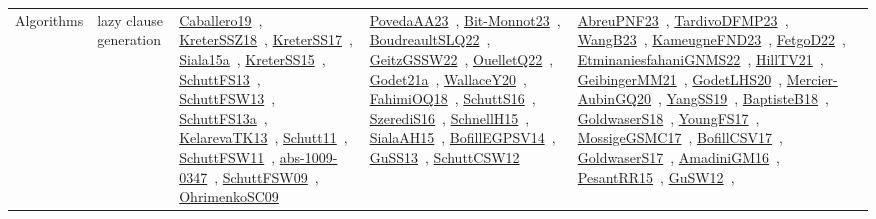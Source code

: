 {\begin{longtable}{lp{3cm}>{\raggedright\arraybackslash}p{6cm}>{\raggedright\arraybackslash}p{6cm}>{\raggedright\arraybackslash}p{8cm}}
Algorithms & lazy clause generation & \href{../works/Caballero19.pdf}{Caballero19}~\cite{Caballero19}, \href{../works/KreterSSZ18.pdf}{KreterSSZ18}~\cite{KreterSSZ18}, \href{../works/KreterSS17.pdf}{KreterSS17}~\cite{KreterSS17}, \href{../works/Siala15a.pdf}{Siala15a}~\cite{Siala15a}, \href{../works/KreterSS15.pdf}{KreterSS15}~\cite{KreterSS15}, \href{../works/SchuttFS13.pdf}{SchuttFS13}~\cite{SchuttFS13}, \href{../works/SchuttFSW13.pdf}{SchuttFSW13}~\cite{SchuttFSW13}, \href{../works/SchuttFS13a.pdf}{SchuttFS13a}~\cite{SchuttFS13a}, \href{../works/KelarevaTK13.pdf}{KelarevaTK13}~\cite{KelarevaTK13}, \href{../works/Schutt11.pdf}{Schutt11}~\cite{Schutt11}, \href{../works/SchuttFSW11.pdf}{SchuttFSW11}~\cite{SchuttFSW11}, \href{../works/abs-1009-0347.pdf}{abs-1009-0347}~\cite{abs-1009-0347}, \href{../works/SchuttFSW09.pdf}{SchuttFSW09}~\cite{SchuttFSW09}, \href{../works/OhrimenkoSC09.pdf}{OhrimenkoSC09}~\cite{OhrimenkoSC09} & \href{../works/PovedaAA23.pdf}{PovedaAA23}~\cite{PovedaAA23}, \href{../works/Bit-Monnot23.pdf}{Bit-Monnot23}~\cite{Bit-Monnot23}, \href{../works/BoudreaultSLQ22.pdf}{BoudreaultSLQ22}~\cite{BoudreaultSLQ22}, \href{../works/GeitzGSSW22.pdf}{GeitzGSSW22}~\cite{GeitzGSSW22}, \href{../works/OuelletQ22.pdf}{OuelletQ22}~\cite{OuelletQ22}, \href{../works/Godet21a.pdf}{Godet21a}~\cite{Godet21a}, \href{../works/WallaceY20.pdf}{WallaceY20}~\cite{WallaceY20}, \href{../works/FahimiOQ18.pdf}{FahimiOQ18}~\cite{FahimiOQ18}, \href{../works/SchuttS16.pdf}{SchuttS16}~\cite{SchuttS16}, \href{../works/SzerediS16.pdf}{SzerediS16}~\cite{SzerediS16}, \href{../works/SchnellH15.pdf}{SchnellH15}~\cite{SchnellH15}, \href{../works/SialaAH15.pdf}{SialaAH15}~\cite{SialaAH15}, \href{../works/BofillEGPSV14.pdf}{BofillEGPSV14}~\cite{BofillEGPSV14}, \href{../works/GuSS13.pdf}{GuSS13}~\cite{GuSS13}, \href{../works/SchuttCSW12.pdf}{SchuttCSW12}~\cite{SchuttCSW12} & \href{../works/AbreuPNF23.pdf}{AbreuPNF23}~\cite{AbreuPNF23}, \href{../works/TardivoDFMP23.pdf}{TardivoDFMP23}~\cite{TardivoDFMP23}, \href{../works/WangB23.pdf}{WangB23}~\cite{WangB23}, \href{../works/KameugneFND23.pdf}{KameugneFND23}~\cite{KameugneFND23}, \href{../works/FetgoD22.pdf}{FetgoD22}~\cite{FetgoD22}, \href{../works/EtminaniesfahaniGNMS22.pdf}{EtminaniesfahaniGNMS22}~\cite{EtminaniesfahaniGNMS22}, \href{../works/HillTV21.pdf}{HillTV21}~\cite{HillTV21}, \href{../works/GeibingerMM21.pdf}{GeibingerMM21}~\cite{GeibingerMM21}, \href{../works/GodetLHS20.pdf}{GodetLHS20}~\cite{GodetLHS20}, \href{../works/Mercier-AubinGQ20.pdf}{Mercier-AubinGQ20}~\cite{Mercier-AubinGQ20}, \href{../works/YangSS19.pdf}{YangSS19}~\cite{YangSS19}, \href{../works/BaptisteB18.pdf}{BaptisteB18}~\cite{BaptisteB18}, \href{../works/GoldwaserS18.pdf}{GoldwaserS18}~\cite{GoldwaserS18}, \href{../works/YoungFS17.pdf}{YoungFS17}~\cite{YoungFS17}, \href{../works/MossigeGSMC17.pdf}{MossigeGSMC17}~\cite{MossigeGSMC17}, \href{../works/BofillCSV17.pdf}{BofillCSV17}~\cite{BofillCSV17}, \href{../works/GoldwaserS17.pdf}{GoldwaserS17}~\cite{GoldwaserS17}, \href{../works/AmadiniGM16.pdf}{AmadiniGM16}~\cite{AmadiniGM16}, \href{../works/PesantRR15.pdf}{PesantRR15}~\cite{PesantRR15}, \href{../works/GuSW12.pdf}{GuSW12}~\cite{GuSW12}, 
\end{longtable}}
